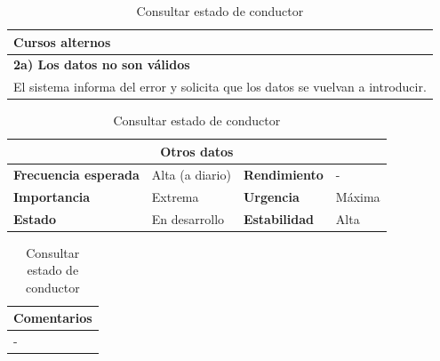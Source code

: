 \documentclass[12pt,spanish]{article}
\begin{document}
\begin{table}[H]
\vspace{1cm}

\begin{tabular}{|m{10pt}|m{7.15cm}|m{10pt}|m{7.15cm}|}
\hline
\multicolumn{4}{|m{16.2cm}|}{\textbf{Cursos alternos}} \\
\hline
\multicolumn{4}{|m{16.2cm}|}{\textbf{2a) Los datos no son válidos}} \\
\hline
\multicolumn{4}{|m{16.2cm}|}{El sistema informa del error y solicita que los datos se vuelvan a introducir.} \\
\hline
\end{tabular}

\vspace{1cm}

\begin{tabular}{|m{3.72cm}|m{3.72cm}|m{3.72cm}|m{3.72cm}|}
\hline
\multicolumn{4}{|c|}{\textbf{Otros datos}} \\
\hline
\textbf{Frecuencia esperada} & Alta (a diario) & \textbf{Rendimiento} & - \\
\hline
\textbf{Importancia} & Extrema & \textbf{Urgencia} & Máxima \\
\hline
\textbf{Estado} & En desarrollo & \textbf{Estabilidad} & Alta \\
\hline
\end{tabular}

\vspace{1cm}

\begin{tabular}{|m{16.2cm}|}
\hline
\textbf{Comentarios} \\
\hline
- \\
\hline
\end{tabular}

\caption{Consultar estado de conductor}

\end{table}

\end{document}

